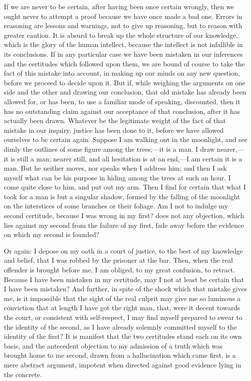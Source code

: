If we are never to be certain, after having been once certain
wrongly, then we ought never to attempt a proof because we have once
made a bad one. Errors in reasoning are lessons and warnings, not to
give up reasoning, but to reason with greater caution. It is absurd to
break up the whole structure of our knowledge, which is the glory of
the human intellect, because the intellect is not infallible in its
conclusions. If in any particular case we have been mistaken in our
inferences and the certitudes which followed upon them, we are bound
of course to take the fact of this mistake into account, in making up
our minds on any new question, before we proceed to decide upon it.
But if, while weighing the arguments on one side and the other and
drawing our conclusion, that old mistake has already been allowed for,
or has been, to use a familiar mode of speaking, discounted, then it
has no outstanding claim against our acceptance of that
conclusion, after it has actually been drawn. Whatever be the
legitimate weight of the fact of that mistake in our inquiry, justice
has been done to it, before we have allowed ourselves to be certain
again. Suppose I am walking out in the moonlight, and see dimly the
outlines of some figure among the trees;—it is a man. I draw nearer,—it
is still a man; nearer still, and all hesitation is at an end,—I am
certain it is a man. But he neither moves, nor speaks when I address
him; and then I ask myself what can be his purpose in hiding among the
trees at such an hour. I come quite close to him, and put out my arm.
Then I find for certain that what I took for a man is but a singular
shadow, formed by the falling of the moonlight on the interstices of
some branches or their foliage. Am I not to indulge my second
certitude, because I was wrong in my first? does not any objection,
which lies against my second from the failure of my first, fade away
before the evidence on which my second is founded?

Or again: I depose on my oath in a court of justice, to the best of
my knowledge and belief, that I was robbed by the prisoner at the bar.
Then, when the real offender is brought before me, I am obliged, to my
great confusion, to retract. Because I have been mistaken in my
certitude, may I not at least be certain that I have been mistaken?
And further, in spite of the shock which that mistake gives me, is it
impossible that the sight of the real culprit may give me so luminous
a conviction that at length I have got the right man, that, were it
decent towards the court, or consistent with self-respect, I may
find myself prepared to swear to the identity of the second, as I have
already solemnly committed myself to the identity of the first? It is
manifest that the two certitudes stand each on its own basis, and the
antecedent objection to my admission of a truth which was brought home
to me second, drawn from a hallucination which came first, is a mere
abstract argument, impotent when directed against good evidence lying
in the concrete.

